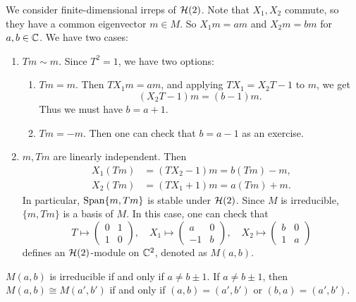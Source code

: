 \begin{example}\label{ex:hh2-module}
  We consider finite-dimensional
  irreps of $\mathcal{H}(2)$. Note that
  $X_1, X_2$ commute, so they have a
  common eigenvector $m \in M$. So
  $X_1 m = a m$ and $X_2 m = b m$
  for $a, b \in \mathbb{C}$. We have two cases:
  \begin{enumerate}
    \item $Tm \sim m$. Since $T^2 = 1$,
      we have two options:
      \begin{enumerate}
        \item $Tm = m$. Then
          $T X_1 m = a m$, and applying
          $T X_1 = X_2 T - 1$ to $m$, we get
          \[
            (X_2 T - 1) m = (b - 1) m.
          \]
          Thus we must have $b = a + 1$.
        \item $Tm = -m$. Then
          one can check that $b = a - 1$
          as an exercise.
      \end{enumerate}
    \item $m, Tm$ are linearly independent.
      Then
      \begin{align*}
        X_1 (Tm) &= (T X_2 - 1)m
        = b(Tm) - m, \\
        X_2 (Tm) &= (T X_1 + 1)m
        = a(Tm) + m.
      \end{align*}
      In particular, $\operatorname{Span}\{m, Tm\}$
      is stable under $\mathcal{H}(2)$.
      Since $M$ is irreducible,
      $\{m, Tm\}$ is a basis of $M$.
      In this case, one can check that
      \[
        T \mapsto
        \begin{pmatrix}
          0 & 1 \\
          1 & 0
        \end{pmatrix}, \quad
        X_1 \mapsto
        \begin{pmatrix}
          a & 0 \\
          -1 & b
        \end{pmatrix}, \quad
        X_2 \mapsto
        \begin{pmatrix}
          b & 0 \\
          1 & a
        \end{pmatrix}
      \]
      defines an $\mathcal{H}(2)$-module on
      $\mathbb{C}^2$, denoted as $M(a, b)$.
  \end{enumerate}
\end{example}

\begin{lemma}\label{lem:hh2-irreps}
  $M(a, b)$ is irreducible if and only if
  $a \ne b \pm 1$. If
  $a \ne b \pm 1$, then
  $M(a, b) \cong M(a', b')$ if and only
  if $(a, b) = (a', b')$ or
  $(b, a) = (a', b')$.
\end{lemma}
